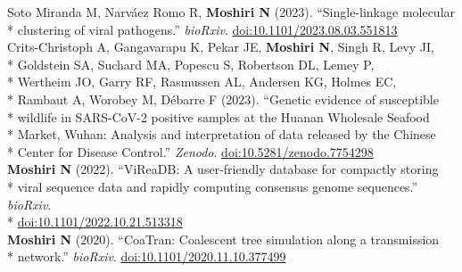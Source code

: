 \documentclass[margin,line]{res}
\begin{document}
\begin{resume}
\hspace*{4mm} Soto Miranda M, Narv\'{a}ez Romo R, \textbf{Moshiri N} (2023). ``Single-linkage molecular\\*\vspace{2mm}
\hspace*{8mm} clustering of viral pathogens.'' \textit{bioRxiv}. \href{https://doi.org/10.1101/2023.08.03.551813}{doi:10.1101/2023.08.03.551813}\\
\hspace*{4mm} Crits-Christoph A, Gangavarapu K, Pekar JE, \textbf{Moshiri N}, Singh R, Levy JI,\\*
\hspace*{9.5mm} Goldstein SA, Suchard MA, Popescu S, Robertson DL, Lemey P,\\*
\hspace*{9.5mm} Wertheim JO, Garry RF, Rasmussen AL, Andersen KG, Holmes EC,\\*
\hspace*{9.5mm} Rambaut A, Worobey M, D\'ebarre F (2023). ``Genetic evidence of susceptible\\*
\hspace*{9.5mm} wildlife in SARS-CoV-2 positive samples at the Huanan Wholesale Seafood\\*
\hspace*{9.5mm} Market, Wuhan: Analysis and interpretation of data released by the Chinese\\*\vspace{2mm}
\hspace*{8mm} Center for Disease Control.'' \textit{Zenodo}. \href{https://doi.org/10.5281/zenodo.7754298}{doi:10.5281/zenodo.7754298}\\
\hspace*{4mm} \textbf{Moshiri N} (2022). ``ViReaDB: A user-friendly database for compactly storing\\*
\hspace*{9.5mm} viral sequence data and rapidly computing consensus genome sequences.'' \textit{bioRxiv}.\\*\vspace{2mm}
\hspace*{8mm} \href{https://doi.org/10.1101/2022.10.21.513318}{doi:10.1101/2022.10.21.513318}\\
\hspace*{4mm} \textbf{Moshiri N} (2020). ``CoaTran: Coalescent tree simulation along a transmission\\*\vspace{2mm}
\hspace*{8mm} network.'' \textit{bioRxiv}. \href{https://doi.org/10.1101/2020.11.10.377499}{doi:10.1101/2020.11.10.377499}\\

\end{resume}
\end{document}
